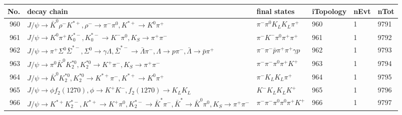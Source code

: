 \begin{table}[htbp] 
\begin{center}
\begin{small}
\begin{tabular}{rlllll}\hline\hline
 No. & decay chain & final states &  iTopology & nEvt & nTot \\\hline
960&$J/\psi       \rightarrow \bar{K}^{0}   \rho^{-}      K^{*+}         , \rho^{-}       \rightarrow \pi^{-}        \pi^{0}        , K^{*+}          \rightarrow K^{0}          \pi^{+}        $&$\pi^{-}        \pi^{0}        K_{L}          K_{L}          \pi^{+}        $&  960&    1& 9791\\
961&$J/\psi       \rightarrow K^{0}          \pi^{+}        K_{0}^{*-}     , K_{0}^{*-}      \rightarrow K^{-}          \pi^{0}        , K_{S}           \rightarrow \pi^{+}        \pi^{-}        $&$\pi^{-}        K^{-}          \pi^{0}        \pi^{+}        \pi^{+}        $&  961&    1& 9792\\
962&$J/\psi       \rightarrow \pi^{+}        \Sigma^0          \bar{\Sigma}^{*-}, \Sigma^0           \rightarrow \gamma       \Lambda           , \bar{\Sigma}^{*-} \rightarrow \bar{\Lambda}    \pi^{-}        , \Lambda            \rightarrow p                 \pi^{-}        , \bar{\Lambda}     \rightarrow \bar{p}          \pi^{+}        $&$\pi^{-}        \pi^{-}        \bar{p}          \pi^{+}        \pi^{+}        \gamma       p                 $&  962&    1& 9793\\
963&$J/\psi       \rightarrow \pi^{0}        \bar{K}^{0}   K_2^{*0}       , K_2^{*0}        \rightarrow K^{+}          \pi^{-}        , K_{S}           \rightarrow \pi^{+}        \pi^{-}        $&$\pi^{-}        \pi^{-}        \pi^{0}        \pi^{+}        K^{+}          $&  963&    1& 9794\\
964&$J/\psi       \rightarrow \bar{K}^{0}   K_2^{*0}       , K_2^{*0}        \rightarrow K^{*+}         \pi^{-}        , K^{*+}          \rightarrow K^{0}          \pi^{+}        $&$\pi^{-}        K_{L}          K_{L}          \pi^{+}        $&  964&    1& 9795\\
965&$J/\psi       \rightarrow \phi           f_{2}(1270)    , \phi            \rightarrow K^{+}          K^{-}          , f_{2}(1270)     \rightarrow K_{L}          K_{L}          $&$K^{-}          K_{L}          K_{L}          K^{+}          $&  965&    1& 9796\\
966&$J/\psi       \rightarrow K^{*+}         K_2^{*-}       , K^{*+}          \rightarrow K^{+}          \pi^{0}        , K_2^{*-}        \rightarrow \bar{K}^{*}   \pi^{-}        , \bar{K}^{*}    \rightarrow \bar{K}^{0}   \pi^{0}        , K_{S}           \rightarrow \pi^{+}        \pi^{-}        $&$\pi^{-}        \pi^{-}        \pi^{0}        \pi^{0}        \pi^{+}        K^{+}          $&  966&    1& 9797\\

\end{tabular}
\end{small}
\end{center}
\end{table}
